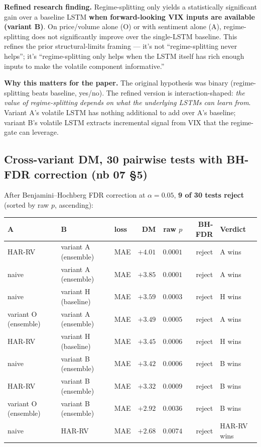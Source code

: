 \documentclass[11pt]{article}
\begin{document}
\textbf{Refined research finding.} Regime-splitting only yields a statistically significant gain over a baseline LSTM \textbf{when forward-looking VIX inputs are available (variant B)}. On price/volume alone (O) or with sentiment alone (A), regime-splitting does not significantly improve over the single-LSTM baseline. This refines the prior structural-limits framing --- it's not ``regime-splitting never helps''; it's ``regime-splitting only helps when the LSTM itself has rich enough inputs to make the volatile component informative.''

\textbf{Why this matters for the paper.} The original hypothesis was binary (regime-splitting beats baseline, yes/no). The refined version is interaction-shaped: \emph{the value of regime-splitting depends on what the underlying LSTMs can learn from}. Variant A's volatile LSTM has nothing additional to add over A's baseline; variant B's volatile LSTM extracts incremental signal from VIX that the regime-gate can leverage.

\subsection*{Cross-variant DM, 30 pairwise tests with BH-FDR correction (nb 07 \S 5)}

After Benjamini--Hochberg FDR correction at $\alpha = 0.05$, \textbf{9 of 30 tests reject} (sorted by raw $p$, ascending):

\begin{center}
\renewcommand{\arraystretch}{1.1}
\begin{tabular}{@{}p{2.6cm}p{3.2cm}lrrrl@{}}
\toprule
A & B & loss & DM & raw $p$ & BH-FDR & Verdict \\
\midrule
HAR-RV               & variant A (ensemble) & MAE & $+4.01$ & $0.0001$ & reject & A wins \\
naive                & variant A (ensemble) & MAE & $+3.85$ & $0.0001$ & reject & A wins \\
naive                & variant H (baseline) & MAE & $+3.59$ & $0.0003$ & reject & H wins \\
variant O (ensemble) & variant A (ensemble) & MAE & $+3.49$ & $0.0005$ & reject & A wins \\
HAR-RV               & variant H (baseline) & MAE & $+3.45$ & $0.0006$ & reject & H wins \\
naive                & variant B (ensemble) & MAE & $+3.42$ & $0.0006$ & reject & B wins \\
HAR-RV               & variant B (ensemble) & MAE & $+3.32$ & $0.0009$ & reject & B wins \\
variant O (ensemble) & variant B (ensemble) & MAE & $+2.92$ & $0.0036$ & reject & B wins \\
naive                & HAR-RV               & MAE & $+2.68$ & $0.0074$ & reject & HAR-RV wins \\
\bottomrule
\end{tabular}
\end{center}
\end{document}
